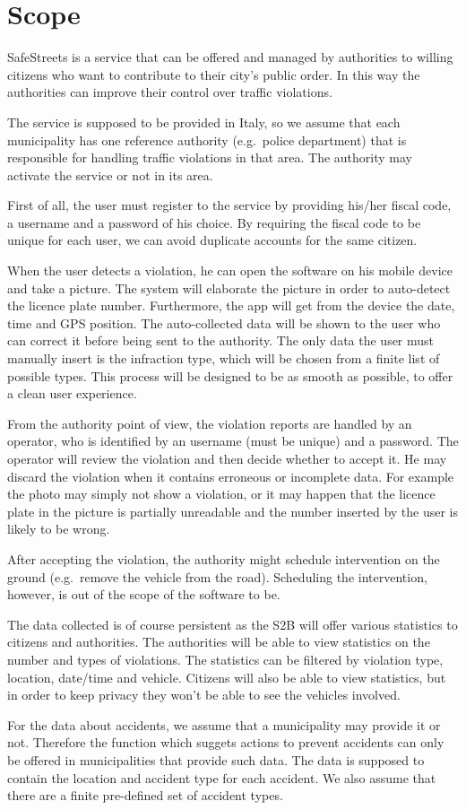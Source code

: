 \section{Scope}
SafeStreets is a service that can be offered and managed by authorities
to willing citizens who want to contribute to their city’s public order.
In this way the authorities can improve their control over traffic violations.

The service is supposed to be provided in Italy, so we assume that each
municipality has one reference authority (e.g.\ police department) that is
responsible for handling traffic violations in that area.
The authority may activate the service or not in its area.


First of all, the user must register to the service by providing his/her 
fiscal code, a username and a password of his choice.
By requiring the fiscal code to be unique for each user, we can avoid
duplicate accounts for the same citizen.

When the user detects a violation, he can open the software on his mobile 
device and take a picture. The system will elaborate the picture in order to 
auto-detect the licence plate number. Furthermore, the app will get from the 
device the date, time and GPS position. The auto-collected data will be shown 
to the user who can correct it before being sent to the authority.
The only data the user must manually insert is the infraction type, which 
will be chosen from a finite list of possible types.
This process will be designed to be as smooth as possible, to offer a clean 
user experience.

From the authority point of view, the violation reports are handled by
an operator, who is identified by an username (must be unique) and
a password.
The operator will review the violation and then decide whether to accept it.
He may discard the violation when it contains erroneous or incomplete data.
For example the photo may simply not show a violation, or it may happen that
the licence plate in the picture is partially unreadable and the number
inserted by the user is likely to be wrong.

After accepting the violation, the authority might schedule intervention
on the ground (e.g.\ remove the vehicle from the road).
Scheduling the intervention, however, is out of the scope of the software
to be.

The data collected is of course persistent as the S2B will offer various
statistics to citizens and authorities.
The authorities will be able to view statistics on the number and types of
violations.
The statistics can be filtered by violation type, location, date/time and
vehicle.
Citizens will also be able to view statistics, but in order to keep privacy
they won't be able to see the vehicles involved.

For the data about accidents, we assume that a municipality may provide it
or not. Therefore the function which suggets actions to prevent accidents
can only be offered in municipalities that provide such data.
The data is supposed to contain the location and accident type for each accident.
We also assume that there are a finite pre-defined set of accident types.